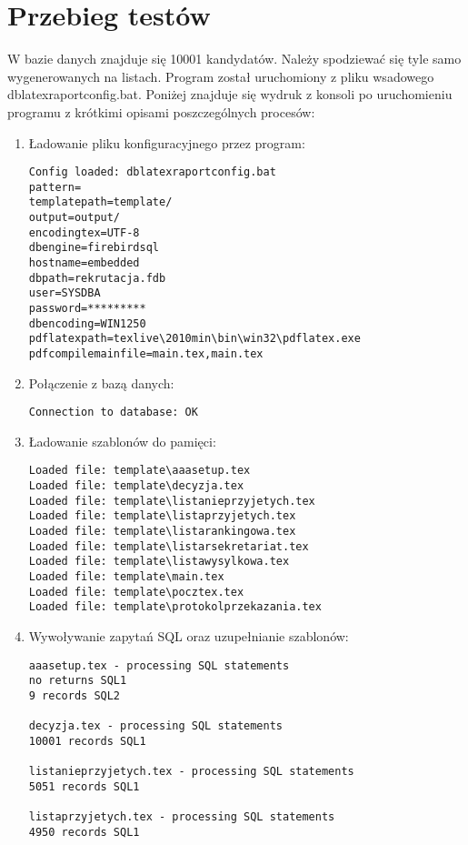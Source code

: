 \section{Przebieg testów}

W bazie danych znajduje się 10001 kandydatów. Należy spodziewać się tyle samo wygenerowanych na listach.  Program został uruchomiony z pliku wsadowego dblatexraportconfig.bat. Poniżej znajduje się wydruk z konsoli po uruchomieniu programu z krótkimi opisami poszczególnych procesów:

\begin{enumerate}
\item Ładowanie pliku konfiguracyjnego przez program:
\begin{verbatim}
Config loaded: dblatexraportconfig.bat
pattern=
templatepath=template/
output=output/
encodingtex=UTF-8
dbengine=firebirdsql
hostname=embedded
dbpath=rekrutacja.fdb
user=SYSDBA
password=*********
dbencoding=WIN1250
pdflatexpath=texlive\2010min\bin\win32\pdflatex.exe
pdfcompilemainfile=main.tex,main.tex
 \end{verbatim}
 
 \item Połączenie z bazą danych:
\begin{verbatim}
Connection to database: OK
 \end{verbatim}
 
  \item Ładowanie szablonów do pamięci:
\begin{verbatim}
Loaded file: template\aaasetup.tex
Loaded file: template\decyzja.tex
Loaded file: template\listanieprzyjetych.tex
Loaded file: template\listaprzyjetych.tex
Loaded file: template\listarankingowa.tex
Loaded file: template\listarsekretariat.tex
Loaded file: template\listawysylkowa.tex
Loaded file: template\main.tex
Loaded file: template\pocztex.tex
Loaded file: template\protokolprzekazania.tex
 \end{verbatim}
 
   \item Wywoływanie zapytań SQL oraz uzupełnianie szablonów:
 \begin{verbatim}
aaasetup.tex - processing SQL statements
no returns SQL1
9 records SQL2

decyzja.tex - processing SQL statements
10001 records SQL1

listanieprzyjetych.tex - processing SQL statements
5051 records SQL1

listaprzyjetych.tex - processing SQL statements
4950 records SQL1


\end{verbatim}
\end{enumerate}
